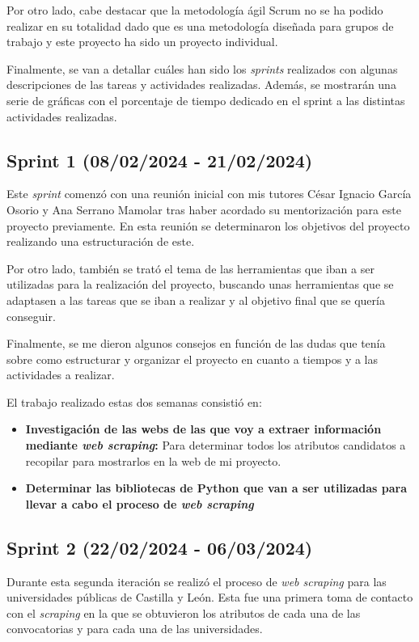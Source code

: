 Por otro lado, cabe destacar que la metodología ágil Scrum no se ha podido realizar en su totalidad dado que es una metodología diseñada para grupos de trabajo y este proyecto ha sido un proyecto individual.

Finalmente, se van a detallar cuáles han sido los \textit{sprints} realizados con algunas descripciones de las tareas y actividades realizadas. Además, se mostrarán una serie de gráficas con el porcentaje de tiempo dedicado en el sprint a las distintas actividades realizadas.

\subsection{Sprint 1 (08/02/2024 -
21/02/2024)}

Este \textit{sprint} comenzó con una reunión inicial con mis tutores César Ignacio García Osorio y Ana Serrano Mamolar tras haber acordado su mentorización para este proyecto previamente. En esta reunión se determinaron los objetivos del proyecto realizando una estructuración de este.

Por otro lado, también se trató el tema de las herramientas que iban a ser utilizadas para la realización del proyecto, buscando unas herramientas que se adaptasen a las tareas que se iban a realizar y al objetivo final que se quería conseguir. 

Finalmente, se me dieron algunos consejos en función de las dudas que tenía sobre como estructurar y organizar el proyecto en cuanto a tiempos y a las actividades a realizar.


El trabajo realizado estas dos semanas consistió en:
\begin{itemize}
\item 
\textbf{Investigación de las webs de las que voy a extraer información mediante \textit{web scraping}: } Para determinar todos los atributos candidatos a recopilar para mostrarlos en la web de mi proyecto.
\item 
\textbf{Determinar las bibliotecas de Python que van a ser utilizadas para llevar a cabo el proceso de \textit{web scraping} }

\end{itemize}


\subsection{Sprint 2 (22/02/2024 -
06/03/2024)}
Durante esta segunda iteración se realizó el proceso de \textit{web scraping} para las universidades públicas de Castilla y León. Esta fue una primera toma de contacto con el \textit{scraping} en la que se obtuvieron los atributos de cada una de las convocatorias y para cada una de las universidades.

